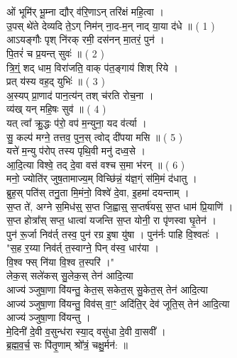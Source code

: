 \section{}
ओं भूमि॑र् भू॒म्ना द्यौर् व॑रि॒णाऽन् तरि॑क्षं महि॒त्वा ।\\
उ॒पस् थे॑ते देव्यदि ते॒ऽग् निम॑न् ना॒द-म॒न् नाद् या॒या द॑धे ॥   ( 1 )\\
आऽयङ्गौः पृश् नि॑रक् रमी॒ दस॑नन् मा॒तरं॒ पुन॑ ।\\
पि॒तरं॑ च प्र॒यन्त् सुवः॑ ॥ ( 2 )\\
त्रि॒ग्ं॒ शद् धाम॒ विरा॑जति॒ वाक् प॑त॒ङ्गाय॑ शिश् रिये ।\\
प्रत् य॑स्य वह॒द् युभिः॑ ॥ ( 3 )\\
अ॒स्यप् प्रा॒णाद॑ पान॒त्य॑न् तश् च॑रति रोच॒ना ।\\
व्य॑ख् यन् महि॒षः सुव॑ ॥ ( 4 )\\
यत् त्वा᳚ क्रु॒द्धः प॑रो॒ वप॑ म॒न्युना॒ यद व॑र्त्या ।\\
सु॒ कल्प॑ मग्ने॒ तत्तव॒ पुन॒स् त्वोद् दी॑पया मसि ॥ ( 5 )\\
यत्ते॑ म॒न्यु प॑रोप् तस्य पृथि॒वी मनु॑ दध्व॒से ।\\
आ॒दि॒त्या विश्वे॒ तद् दे॒वा वस॑ वश्च स॒मा भ॑रन् ॥ ( 6 )\\
मनो॒ ज्योति॑र् जुष॒तामाज्य॒म् विच्छि॑न्नं॒ य॑ज्ञ॒ग्ं स॑मि॒मं द॑धातु ।\\
ब्रुह॒स् पति॑स् तनु॒ता मि॒मंनो॒ विश्वे॑ दे॒वा, इ॒हमा॑ दयन्ताम् ।\\
स॒प्त ते॑, अग्ने स॒मिध॑स्॒ स॒प्त जि॒ह्वास्॒ स॒प्तर्ष॑यस्॒ स॒प्त धाम॑ प्रि॒याणि॑ ।\\
स॒प्त होत्रा᳚स् सप्त॒ धात्वा॑ यजन्ति स॒प्त योनी॒ रा पृ॑णस्वा घृ॒तेन॑ ।\\
पुन॑ रू॒र्जा निव॑र्त् तस्व॒ पुन॑ रग्र इ॒षा यु॑षा । पुन॑र्नः पाहि वि॒श्वतः॑ ।\\
"स॒ह र॒य्या निव॑र्त् त॒स्वाग्ने॒ पिन् व॑स्व॒ धार॑या । \\
{\small{}} वि॒श्व फ्स् नि॑या वि॒श्व त॒स्परि॑ ।"\\
लेक॒स् सले॑कस् सु॒लेक॒स् तेन॑ आदि॒त्या \\
आज्य॑ ञ्जुषा॒णा वि॑यन्तु॒ केत॒स् सकेत॒स् सु॒केत॒स् तेन॑ आदि॒त्या\\
आज्य॑ ञ्जुषा॒णा वि॑यन्तु॒ विव॑स् वा॒ꣳ॒ अदि॑ति॒र् देव॑ जूति॒स् तेन॑ आदि॒त्या\\
आज्य॑ ञ्जुषा॒णा वि॑यन्तु ।\\
मे॒दिनी॑ दे॒वी व॒सुन्ध॑रा स्या॒द् वसु॑धा दे॒वी वा॒सवी᳚ ।\\
ब्र॒ह्म॒व॒र्च॒ सः पि॑तृ॒णाम् श्रो᳚त्रं॒ चक्षु॒र्मन॑: ॥\\
